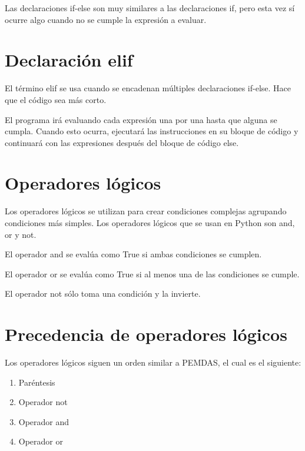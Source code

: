 \documentclass{report}
\begin{document}
{Las declaraciones if-else son muy similares a las declaraciones if, pero esta vez sí ocurre algo cuando no se cumple la expresión a evaluar.



\section{Declaración elif}

El término elif se usa cuando se encadenan múltiples declaraciones if-else. Hace que el código sea más corto.


El programa irá evaluando cada expresión una por una hasta que alguna se cumpla. Cuando esto ocurra, ejecutará las instrucciones en su bloque de código y continuará con las expresiones después del bloque de código else.

\section{Operadores lógicos}

Los operadores lógicos se utilizan para crear condiciones complejas agrupando condiciones más simples. Los operadores lógicos que se usan en Python son and, or y not.

El operador and se evalúa como True si ambas condiciones se cumplen.


El operador or se evalúa como True si al menos una de las condiciones se cumple.


El operador not sólo toma una condición y la invierte.


\section{Precedencia de operadores lógicos}

Los operadores lógicos siguen un orden similar a PEMDAS, el cual es el siguiente:

\begin{enumerate}
  \item Paréntesis
  \item Operador not
  \item Operador and
  \item Operador or
\end{enumerate}

}
\end{document}
